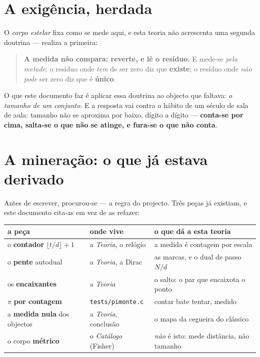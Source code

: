 \documentclass[11pt,a4paper]{article}
\newcommand{\code}[1]{\texttt{\small #1}}
\begin{document}
\section{A exigência, herdada}

O \emph{corpo estelar} fixa como se mede aqui, e esta teoria não acrescenta uma segunda doutrina
--- realiza a primeira:

\begin{quote}
\textbf{A medida não compara: reverte, e lê o resíduo.} E mede-se \emph{pela metade}: o resíduo
onde \emph{tem} de ser zero diz que \textbf{existe}; o resíduo onde \emph{não pode} ser zero diz
que é \textbf{único}.
\end{quote}

\noindent O que este documento faz é aplicar essa doutrina ao objecto que faltava: \emph{o
tamanho de um conjunto}. E a resposta vai contra o hábito de um século de sala de aula: tamanho
não se aproxima por baixo, dígito a dígito --- \textbf{conta-se por cima, salta-se o que não se
atinge, e fura-se o que não conta}.

\section{A mineração: o que já estava derivado}

Antes de escrever, procurou-se --- a regra do projecto. Três peças já existiam, e este documento
cita-as em vez de as refazer:

\begin{center}\small
\begin{tabular}{@{}lll@{}}
\toprule
a peça & onde vive & o que dá a esta teoria \\
\midrule
o \textbf{contador} $\lfloor t/d\rfloor+1$ & a \emph{Teoria}, o relógio & a medida é contagem por escala \\
o \textbf{pente} autodual & a \emph{Teoria}, a Dirac & as marcas, e o dual de passo $N/d$ \\
os \textbf{encaixantes} & a \emph{Teoria} & o salto: o par que encaixota o ponto \\
$\pi$ \textbf{por contagem} & \code{tests/pimonte.c} & contar bate tentar, medido \\
a \textbf{medida nula} dos objectos & a \emph{Teoria}, conclusão & o mapa da cegueira do clássico \\
o corpo \textbf{métrico} & o \emph{Catálogo} (Fisher) & \emph{não} é isto: mede distância, não tamanho \\
\bottomrule
\end{tabular}
\end{center}
\end{document}
